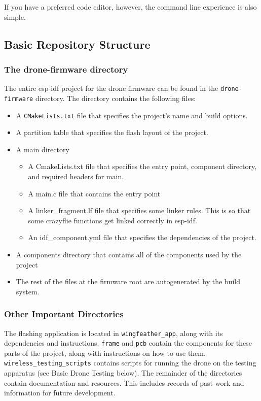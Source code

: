 \documentclass[12pt, titlepage]{article}
\begin{document}
If you have a preferred code editor, however, the command line experience is also simple.

\subsection{Basic Repository Structure}

\subsubsection{The drone-firmware directory}
The entire esp-idf project for the drone firmware can be found in the \texttt{drone-firmware} directory. The directory contains the following files:

\begin{itemize}
  \item A \texttt{CMakeLists.txt} file that specifies the project's name and build options.
  \item A partition table that specifies the flash layout of the project.
  \item A main directory
  \begin{itemize}
    \item A CmakeLists.txt file that specifies the entry point, component directory, and required headers for main.
    \item A main.c file that contains the entry point
    \item A linker\_fragment.lf file that specifies some linker rules. This is so that some crazyflie functions get linked correctly in esp-idf.
    \item An idf\_component.yml file that specifies the dependencies of the project.
  \end{itemize}
  \item A components directory that contains all of the components used by the project
  \item The rest of the files at the firmware root are autogenerated by the build system.
\end{itemize}
  
\subsubsection{Other Important Directories}
The flashing application is located in \texttt{wingfeather\_app}, along with its dependencies and instructions. \texttt{frame} and \texttt{pcb} contain the components for these parts of the project, along with instructions on how to use them. \texttt{wireless\_testing\_scripts} contains scripts for running the drone on the testing apparatus (see Basic Drone Testing below). The remainder of the directories contain documentation and resources. This includes records of past work and information for future development. 
\end{document}
